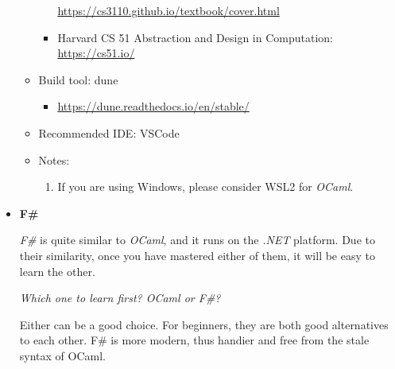 \documentclass{article}
\begin{document}
\begin{itemize}
\begin{itemize}
\begin{itemize}
            \href{https://cs3110.github.io/textbook/cover.html}{https://cs3110.github.io/textbook/cover.html}
            \item Harvard CS 51
            Abstraction and Design in Computation:\\
            \href{https://cs51.io/}{https://cs51.io/}
        \end{itemize}
        \item Build tool:
        dune
        \begin{itemize}
            \item \href{https://dune.readthedocs.io/en/stable/}{https://dune.readthedocs.io/en/stable/}
        \end{itemize}
        \item Recommended IDE:
        VSCode
        \item Notes:
        \begin{enumerate}
            \item If you are using Windows, please consider WSL2 for \emph{OCaml}.
        \end{enumerate}
    \end{itemize}
    
    \item \textbf{F\#}
    
    \emph{F\#} is quite similar to \emph{OCaml}, and it runs on the \emph{.NET} platform.
    Due to their similarity, once you have mastered either of them, it will be easy to learn the other.
    
    \emph{Which one to learn first? OCaml or F\#?}
    
    Either can be a good choice. For beginners, they are both good alternatives to each other. F\# is more modern, thus handier and free from the stale syntax of OCaml.


\end{itemize}
\end{document}
